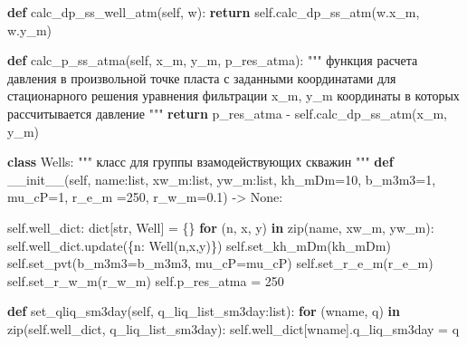 \documentclass[
  russian,
  letterpaper,
  DIV=11,
  numbers=noendperiod,
  oneside]{scrartcl}
\newenvironment{Shaded}{\begin{snugshade}}{\end{snugshade}}
\newcommand{\BuiltInTok}[1]{\textcolor[rgb]{0.00,0.23,0.31}{#1}}
\newcommand{\CommentTok}[1]{\textcolor[rgb]{0.37,0.37,0.37}{#1}}
\newcommand{\ControlFlowTok}[1]{\textcolor[rgb]{0.00,0.23,0.31}{\textbf{#1}}}
\newcommand{\DecValTok}[1]{\textcolor[rgb]{0.68,0.00,0.00}{#1}}
\newcommand{\FloatTok}[1]{\textcolor[rgb]{0.68,0.00,0.00}{#1}}
\newcommand{\FunctionTok}[1]{\textcolor[rgb]{0.28,0.35,0.67}{#1}}
\newcommand{\KeywordTok}[1]{\textcolor[rgb]{0.00,0.23,0.31}{\textbf{#1}}}
\newcommand{\NormalTok}[1]{\textcolor[rgb]{0.00,0.23,0.31}{#1}}
\newcommand{\OperatorTok}[1]{\textcolor[rgb]{0.37,0.37,0.37}{#1}}
\newcommand{\VariableTok}[1]{\textcolor[rgb]{0.07,0.07,0.07}{#1}}
\begin{document}
\begin{Shaded}
\begin{Highlighting}[]
    \KeywordTok{def}\NormalTok{ calc\_dp\_ss\_well\_atm(}\VariableTok{self}\NormalTok{, w):}
        \ControlFlowTok{return} \VariableTok{self}\NormalTok{.calc\_dp\_ss\_atm(w.x\_m, w.y\_m)}

    \KeywordTok{def}\NormalTok{ calc\_p\_ss\_atma(}\VariableTok{self}\NormalTok{, x\_m, y\_m, p\_res\_atma):}
        \CommentTok{"""}
\CommentTok{        функция расчета давления в произвольной точке пласта }
\CommentTok{        с заданными координатами}
\CommentTok{        для стационарного решения уравнения фильтрации }
\CommentTok{        x\_m, y\_m координаты в которых рассчитывается давление}
\CommentTok{        """}
        \ControlFlowTok{return}\NormalTok{ p\_res\_atma }\OperatorTok{{-}} \VariableTok{self}\NormalTok{.calc\_dp\_ss\_atm(x\_m, y\_m)}
    
\KeywordTok{class}\NormalTok{ Wells:}
    \CommentTok{"""}
\CommentTok{    класс для группы взамодействующих скважин}
\CommentTok{    """}
    \KeywordTok{def} \FunctionTok{\_\_init\_\_}\NormalTok{(}\VariableTok{self}\NormalTok{, name:}\BuiltInTok{list}\NormalTok{, xw\_m:}\BuiltInTok{list}\NormalTok{, yw\_m:}\BuiltInTok{list}\NormalTok{, }
\NormalTok{                 kh\_mDm}\OperatorTok{=}\DecValTok{10}\NormalTok{, b\_m3m3}\OperatorTok{=}\DecValTok{1}\NormalTok{, }
\NormalTok{                 mu\_cP}\OperatorTok{=}\DecValTok{1}\NormalTok{, r\_e\_m }\OperatorTok{=}\DecValTok{250}\NormalTok{, r\_w\_m}\OperatorTok{=}\FloatTok{0.1}\NormalTok{) }\OperatorTok{{-}\textgreater{}} \VariableTok{None}\NormalTok{:}
        
        \VariableTok{self}\NormalTok{.well\_dict: }\BuiltInTok{dict}\NormalTok{[}\BuiltInTok{str}\NormalTok{, Well] }\OperatorTok{=}\NormalTok{ \{\} }
        \ControlFlowTok{for}\NormalTok{ (n, x, y) }\KeywordTok{in} \BuiltInTok{zip}\NormalTok{(name, xw\_m, yw\_m):}
            \VariableTok{self}\NormalTok{.well\_dict.update(\{n: Well(n,x,y)\})}
        \VariableTok{self}\NormalTok{.set\_kh\_mDm(kh\_mDm)}
        \VariableTok{self}\NormalTok{.set\_pvt(b\_m3m3}\OperatorTok{=}\NormalTok{b\_m3m3, mu\_cP}\OperatorTok{=}\NormalTok{mu\_cP)}
        \VariableTok{self}\NormalTok{.set\_r\_e\_m(r\_e\_m)}
        \VariableTok{self}\NormalTok{.set\_r\_w\_m(r\_w\_m)}
        \VariableTok{self}\NormalTok{.p\_res\_atma }\OperatorTok{=} \DecValTok{250}
    
    \KeywordTok{def}\NormalTok{ set\_qliq\_sm3day(}\VariableTok{self}\NormalTok{, q\_liq\_list\_sm3day:}\BuiltInTok{list}\NormalTok{):}
        \ControlFlowTok{for}\NormalTok{ (wname, q) }\KeywordTok{in} \BuiltInTok{zip}\NormalTok{(}\VariableTok{self}\NormalTok{.well\_dict, q\_liq\_list\_sm3day):}
            \VariableTok{self}\NormalTok{.well\_dict[wname].q\_liq\_sm3day }\OperatorTok{=}\NormalTok{ q}
    

\end{Highlighting}
\end{Shaded}
\end{document}
